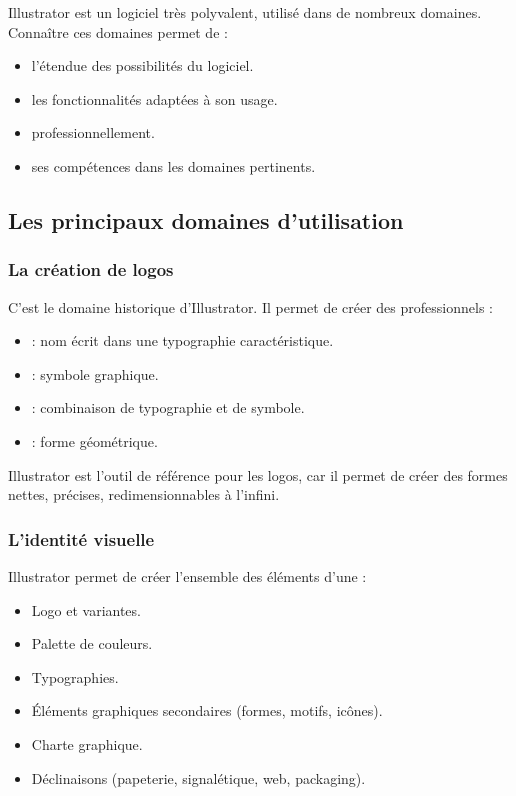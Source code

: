 Illustrator est un logiciel très polyvalent, utilisé dans de nombreux domaines. Connaître ces domaines permet de :

\begin{itemize}
    \item {} l'étendue des possibilités du logiciel.
    \item {} les fonctionnalités adaptées à son usage.
    \item {} professionnellement.
    \item {} ses compétences dans les domaines pertinents.
\end{itemize}

\subsection{Les principaux domaines d'utilisation}

\subsubsection{La création de logos}

C'est le domaine historique d'Illustrator. Il permet de créer des  professionnels :

\begin{itemize}
    \item {} : nom écrit dans une typographie caractéristique.
    \item {} : symbole graphique.
    \item {} : combinaison de typographie et de symbole.
    \item {} : forme géométrique.
\end{itemize}

Illustrator est l'outil de référence pour les logos, car il permet de créer des formes nettes, précises, redimensionnables à l'infini.

\subsubsection{L'identité visuelle}

Illustrator permet de créer l'ensemble des éléments d'une  :

\begin{itemize}
    \item Logo et variantes.
    \item Palette de couleurs.
    \item Typographies.
    \item Éléments graphiques secondaires (formes, motifs, icônes).
    \item Charte graphique.
    \item Déclinaisons (papeterie, signalétique, web, packaging).
\end{itemize}

